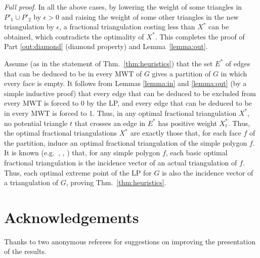 \documentclass[final]{siamltex}
\newcommand{\edges}{E}
\newcommand{\face}{f}
\newcommand{\graph}{G}
\newcommand{\tri}{t}  \newcommand{\vertex}{v}
\newcommand{\fracTriang}{X}
\newenvironment{fullproof}{\par{\it Full proof}. \ignorespaces}{\endproof}
\begin{document}
\begin{fullproof}
In all the above cases,
by lowering the weight of some triangles in $P'_1\cup P'_2$ by $\epsilon>0$
and raising the weight of some other triangles in the new triangulation by $\epsilon$, 
a fractional triangulation costing less than $\fracTriang^*$ can be obtained, which contradicts the optimality of $\fracTriang^*$.
This completes the proof of Part \ref{out:diamond} (diamond property) and Lemma~\ref{lemma:out}. 
\end{fullproof}





Assume (as in the statement of Thm.~\ref{thm:heuristics}) that the set $\edges^*$ of edges
that can be deduced to be in every MWT of $\graph$ 
gives a partition of $\graph$ in which every face is empty.
It follows from Lemmas \ref{lemma:in} and \ref{lemma:out}
(by a simple inductive proof) that every edge that can be deduced to be excluded from every MWT
is forced to 0 by the LP, and every edge that can be deduced to be in every MWT is forced to 1.
Thus, in any optimal fractional triangulation $\fracTriang^*$,
no potential triangle $\tri$ that crosses an edge in $\edges^*$ has positive weight $\fracTriang^*_\tri$.
Thus, the optimal fractional triangulations $\fracTriang^*$ are exactly those that,
for each face $\face$ of the partition, induce an optimal fractional triangulation 
of the simple polygon $\face$.
It is known
(e.g.~\cite[Thm.~7]{dantzig1985triangulations},
\cite[Thm.~4.1(i)]{de1996polytope},
\cite[Cor.~3.6.2]{kirsanov2004minimal})
that, for any simple polygon $\face$, each basic optimal fractional triangulation
is the incidence vector of an actual triangulation of $\face$.
Thus, each optimal extreme point of the LP for $\graph$ is also the incidence vector
of a triangulation of $\graph$, proving Thm.~\ref{thm:heuristics}.



































\section{Acknowledgements}

Thanks to two anonymous referees for suggestions on improving the presentation of the results.



\end{document}
